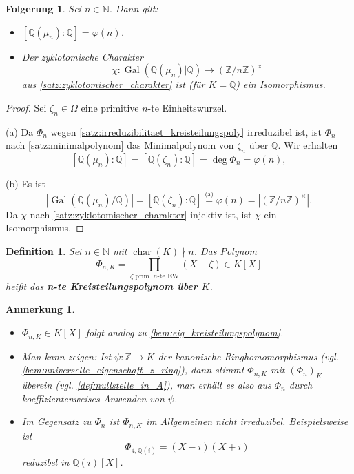 \documentclass[a4paper, twoside, 11pt, ngerman]{report}
\newcommand{\NN}{\mathds N}
\newcommand{\QQ}{\mathds Q}
\newcommand{\ZZ}{\mathds Z}
\DeclareMathOperator{\charact}{char}
\DeclareMathOperator{\Gal}{Gal}
\theoremstyle{definistyle}
\newtheorem{defini}[satz]{Definition}
\newtheorem{anm}[satz]{Anmerkung}
\newtheorem{folgerung}[satz]{Folgerung}
\theoremstyle{remark}
\newcommand{\defn}[1]{\textit{\bfseries #1}}
\begin{document}
\begin{folgerung}\label{folgerung:galgruppe_kreisteilungskp}
Sei $n \in \NN$. Dann gilt:
\begin{itemize}
    \item[(a)] $[\QQ(\mu_n) : \QQ] = \varphi(n)$.
    \item[(b)] Der zyklotomische Charakter \[\chi \colon \Gal(\QQ(\mu_n)|\QQ) \to (\ZZ / n \ZZ)^\times\] aus \ref{satz:zyklotomischer_charakter} ist (für $K = \QQ$) ein Isomorphismus.
\end{itemize}
\end{folgerung}
\begin{proof}
Sei $\zeta_n\in\Omega$ eine primitive $n$-te Einheitswurzel.

(a) Da $\Phi_n$ wegen \ref{satz:irreduzibilitaet_kreisteilungspoly} irreduzibel ist, ist $\Phi_n$ nach \ref{satz:minimalpolynom} das Minimalpolynom von $\zeta_n$ über $\QQ$. Wir erhalten
\[
[\QQ(\mu_n) : \QQ] = [\QQ(\zeta_n) : \QQ] = \deg \Phi_n = \varphi(n),
\]

(b) Es ist
\[
|\Gal(\QQ(\mu_n) / \QQ)| = [\QQ(\zeta_n) : \QQ] \overset{\text{(a)}}{=} \varphi(n) = 
|(\ZZ / n \ZZ)^\times|.
\]
Da $\chi$ nach \ref{satz:zyklotomischer_charakter} injektiv ist, ist $\chi$ ein Isomorphismus.
\end{proof}

\begin{defini}\label{def:kreisteilungspolynom_ueber_k}
Sei $n \in \NN$ mit $\charact(K) \nmid n$. Das Polynom
\[
\Phi_{n, K} = \prod_{\zeta \text{ prim. } n\text{-te EW}} (X - \zeta) \in K[X]
\]
heißt das \defn{n-te Kreisteilungspolynom über $K$}.
\end{defini}

\begin{anm}
\begin{itemize}
\item $\Phi_{n, K} \in K[X]$ folgt analog zu \ref{bem:eig_kreisteilungspolynom}.
\item Man kann zeigen: Ist $\psi\colon\ZZ\to K$ der kanonische Ringhomomorphismus (vgl. \ref{bem:universelle_eigenschaft_z_ring}), dann stimmt $\Phi_{n,K}$ mit $(\Phi_n)_K$
überein (vgl. \ref{def:nullstelle_in_A}), man erhält es also aus $\Phi_n$ durch koeffizientenweises Anwenden von $\psi$.
\item Im Gegensatz zu $\Phi_n$ ist $\Phi_{n,K}$ im Allgemeinen nicht irreduzibel.
Beispielsweise ist 
\[
\Phi_{4,\QQ(i)}=(X-i)(X+i)
\]
reduzibel in $\QQ(i)[X]$.
\end{itemize}
\end{anm}
\end{document}
